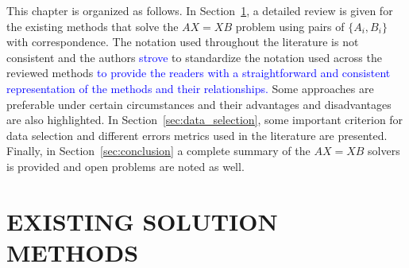 \documentclass[twocolumn,10pt]{asme2ej}
\begin{document}
%
%
This chapter is organized as follows. 
In Section~\ref{sec:sol_methods}, a detailed review is given for the existing methods that solve the $AX=XB$ problem using pairs of $\{A_{i}, B_{i}\}$ with correspondence. The notation used throughout the literature is not consistent and the authors \textcolor{blue}{strove} %
to standardize the notation used across the reviewed methods
\textcolor{blue}{to provide the readers with a straightforward and consistent representation of the methods and their relationships.} %
Some approaches are preferable under certain circumstances and their advantages and disadvantages are also highlighted. 
In Section~\ref{sec:data_selection}, some important criterion for data selection and different errors metrics used in the literature are presented. 
Finally, in Section~\ref{sec:conclusion} a complete summary of the $AX=XB$ solvers is provided and open problems are noted as well.    

\section{EXISTING SOLUTION METHODS}
\label{sec:sol_methods}
 
\end{document}
